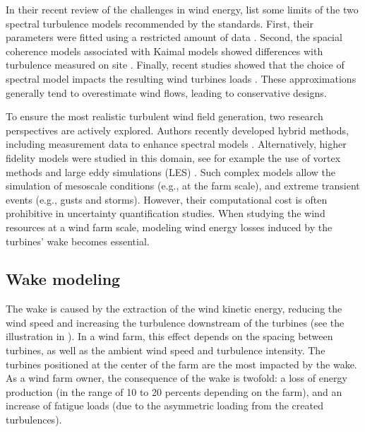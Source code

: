 In their recent review of the challenges in wind energy, \citep{veers_2019_review} list some limits of the two spectral turbulence models recommended by the standards. 
First, their parameters were fitted using a restricted amount of data \citep{dimitrov_2017_turbulence_models_on_loads}. 
Second, the spacial coherence models associated with Kaimal models showed differences with turbulence measured on site \citep{saranyasoontorn_2004}.  
Finally, recent studies showed that the choice of spectral model impacts the resulting wind turbines loads \citep{doubrawa_2019}. 
These approximations generally tend to overestimate wind flows, leading to conservative designs.

To ensure the most realistic turbulent wind field generation, two research perspectives are actively explored. 
Authors recently developed hybrid methods, including measurement data to enhance spectral models \citep{dimitrov_2017_constrained_turbulence}. 
Alternatively, higher fidelity models were studied in this domain, see for example the use of vortex methods \citep{branlard_2017_book} and large eddy simulations (LES) \citep{doubrawa_2019,bui_2022_mesoscale_LES}.  
Such complex models allow the simulation of mesoscale conditions (e.g., at the farm scale), and extreme transient events (e.g., gusts and storms). 
However, their computational cost is often prohibitive in uncertainty quantification studies. 
When studying the wind resources at a wind farm scale, modeling wind energy losses induced by the turbines' wake becomes essential.


\subsection{Wake modeling}

The wake is caused by the extraction of the wind kinetic energy, reducing the wind speed and increasing the turbulence downstream of the turbines (see the illustration in ). 
In a wind farm, this effect depends on the spacing between turbines, as well as the ambient wind speed and turbulence intensity. 
The turbines positioned at the center of the farm are the most impacted by the wake. 
As a wind farm owner, the consequence of the wake is twofold: a loss of energy production (in the range of 10 to 20 percents depending on the farm), and an increase of fatigue loads (due to the asymmetric loading from the created turbulences).

